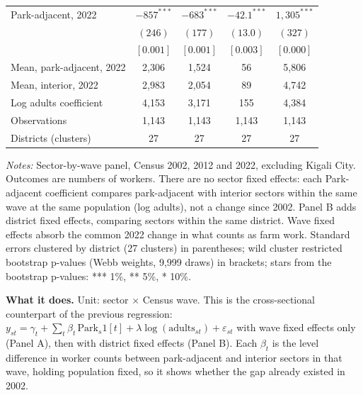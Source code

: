 \documentclass[11pt]{article}
\begin{document}
\begin{table}[H]
\begin{tabular}{lcccc}
Park-adjacent, 2022 & $-857^{***}$ & $-683^{***}$ & $-42.1^{***}$ & $1,305^{***}$ \\
 & $(246)$ & $(177)$ & $(13.0)$ & $(327)$ \\
 & $[0.001]$ & $[0.001]$ & $[0.003]$ & $[0.000]$ \\
Mean, park-adjacent, 2022 & 2,306 & 1,524 & 56 & 5,806 \\
Mean, interior, 2022 & 2,983 & 2,054 & 89 & 4,742 \\
Log adults coefficient & 4,153 & 3,171 & 155 & 4,384 \\
\midrule
Observations & 1,143 & 1,143 & 1,143 & 1,143 \\
Districts (clusters) & 27 & 27 & 27 & 27 \\
\bottomrule
\end{tabular}
\begin{minipage}{0.95\textwidth}\footnotesize
\textit{Notes:} Sector-by-wave panel, Census 2002, 2012 and 2022, excluding Kigali City. Outcomes are numbers of workers. There are no sector fixed effects: each Park-adjacent coefficient compares park-adjacent with interior sectors within the same wave at the same population (log adults), not a change since 2002. Panel B adds district fixed effects, comparing sectors within the same district. Wave fixed effects absorb the common 2022 change in what counts as farm work. Standard errors clustered by district (27 clusters) in parentheses; wild cluster restricted bootstrap p-values (Webb weights, 9,999 draws) in brackets; stars from the bootstrap p-values: *** 1\%, ** 5\%, * 10\%.
\end{minipage}
\end{table}
\textbf{What it does.} Unit: sector $\times$ Census wave. This is the cross-sectional counterpart of the previous regression: $y_{st} = \gamma_t + \sum_t \beta_t\,\mathrm{Park}_s 1[t] + \lambda \log(\mathrm{adults}_{st}) + \varepsilon_{st}$ with wave fixed effects only (Panel A), then with district fixed effects (Panel B). Each $\beta_t$ is the level difference in worker counts between park-adjacent and interior sectors in that wave, holding population fixed, so it shows whether the gap already existed in 2002.
\end{document}
